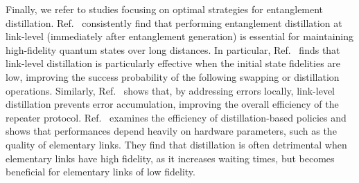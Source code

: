 Finally, we refer to studies focusing on optimal strategies for entanglement distillation.
% 
Ref.~\cite{VanMeter_2008, Nagayama_2021} consistently find that performing entanglement distillation at link-level (immediately after entanglement generation) is essential for maintaining high-fidelity quantum states over long distances. In particular, Ref.~\cite{VanMeter_2008} finds that link-level distillation is particularly effective when the initial state fidelities are low, improving the success probability of the following swapping or distillation operations. Similarly, Ref.~\cite{Nagayama_2021} shows that, by addressing errors locally, link-level distillation prevents error accumulation, improving the overall efficiency of the repeater protocol.
% 
Ref.~\cite{Haldar_2024_Quasi} examines the efficiency of distillation-based policies and shows that performances depend heavily on hardware parameters, such as the quality of elementary links.
They find that distillation is often detrimental when elementary links have high fidelity, as it increases waiting times, but becomes beneficial for elementary links of low fidelity.

